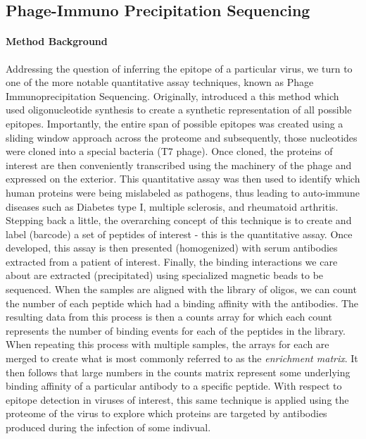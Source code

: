 \documentclass{article}
\begin{document}
\subsection*{Phage-Immuno Precipitation Sequencing}

\paragraph{Method Background}
Addressing the question of inferring the epitope of a particular virus, we turn to one of the more notable quantitative assay techniques, known as Phage Immunoprecipitation Sequencing.
Originally, \citet{Larman2011} introduced a this method which used oligonucleotide synthesis to create a synthetic representation of all possible epitopes.
Importantly, the entire span of possible epitopes was created using a sliding window approach across the proteome and subsequently, those nucleotides were cloned into a special bacteria (T7 phage).
Once cloned, the proteins of interest are then conveniently transcribed using the machinery of the phage and expressed on the exterior.
This quantitative assay was then used to identify which human proteins were being mislabeled as pathogens, thus leading to auto-immune diseases such as Diabetes type I, multiple sclerosis, and rheumatoid arthritis.
Stepping back a little, the overarching concept of this technique is to create and label (barcode) a set of peptides of interest - this is the quantitative assay.
Once developed, this assay is then presented (homogenized) with serum antibodies extracted from a patient of interest.
Finally, the binding interactions we care about are extracted (precipitated) using specialized magnetic beads to be sequenced.
When the samples are aligned with the library of oligos, we can count the number of each peptide which had a binding affinity with the antibodies.
The resulting data from this process is then a counts array for which each count represents the number of binding events for each of the peptides in the library.
When repeating this process with multiple samples, the arrays for each are merged to create what is most commonly referred to as the \textit{enrichment matrix}.
It then follows that large numbers in the counts matrix represent some underlying binding affinity of a particular antibody to a specific peptide.
With respect to epitope detection in viruses of interest, this same technique is applied using the proteome of the virus to explore which proteins are targeted by antibodies produced during the infection of some indivual.
\end{document}
